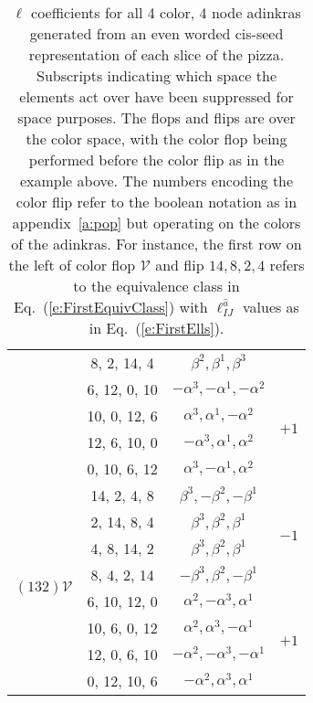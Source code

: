 \begin{table}[!h]
\begin{tabular}{|c|c|c|c|}
			\cline{2-3} 
			&8, 2, 14, 4&  $\beta ^2,\beta ^1,\beta ^3$  & \\
			\cline{2-4} 
			&6, 12, 0, 10& $-\alpha ^3,-\alpha ^1,-\alpha ^2$   & \multirow{4}{*}{$+1$} \\
			\cline{2-3} 
			&10, 0, 12, 6& $\alpha ^3,\alpha ^1,-\alpha ^2$   & \\
			\cline{2-3} 
			&12, 6, 10, 0& $-\alpha ^3,\alpha ^1,\alpha ^2$   & \\
			\cline{2-3} 
			&0, 10, 6, 12& $\alpha ^3,-\alpha ^1,\alpha ^2$ & \\
			\hline
			\hline
			\multirow{8}{*}{$(132)\mathcal{V}$} & 14, 2, 4, 8 & $\beta ^3,-\beta ^2,-\beta ^1$ & \multirow{4}{*}{$-1$}\\
			\cline{2-3}
			&2, 14, 8, 4& $\beta ^3,\beta ^2,\beta ^1$ & \\
			\cline{2-3} 
			&4, 8, 14, 2& $\beta ^3,\beta ^2,\beta ^1$ & \\
			\cline{2-3} 
			&8, 4, 2, 14&  $-\beta ^3,\beta ^2,-\beta ^1$   & \\
			\cline{2-4} 
			&6, 10, 12, 0&  $\alpha ^2,-\alpha ^3,\alpha ^1$  & \multirow{4}{*}{$+1$}\\
			\cline{2-3} 
			&10, 6, 0, 12&  $\alpha ^2,\alpha ^3,-\alpha ^1$  & \\
			\cline{2-3} 
			&12, 0, 6, 10&  $-\alpha ^2,-\alpha ^3,-\alpha ^1$  & \\
			\cline{2-3} 
			&0, 12, 10, 6& $-\alpha ^2,\alpha ^3,\alpha ^1$ & \\
			\hline
			\hline
	\end{tabular}
	\caption{$\ell$ coefficients for all 4 color, 4 node adinkras generated from an even worded cis-seed representation of each slice of the pizza. Subscripts indicating which space the elements act over have been suppressed for space purposes. The flops and flips are over the color space, with the color flop being performed before the color flip as in the example above. The numbers encoding the color flip refer to the boolean notation as in appendix~\ref{a:pop} but operating on the colors of the adinkras. For instance, the first row on the left of color flop $\mathcal{V}$ and flip $14, 8, 2, 4$ refers to the equivalence class in Eq.~(\ref{e:FirstEquivClass}) with $\ell^{\hat{a}}_{IJ}$ values as in Eq.~(\ref{e:FirstElls}).}
\end{table}

